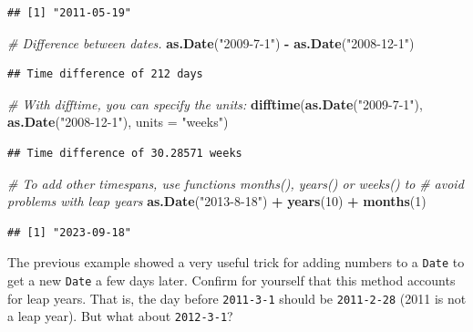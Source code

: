 \documentclass[]{book}
\newenvironment{Shaded}{\begin{snugshade}}{\end{snugshade}}
\newcommand{\CommentTok}[1]{\textcolor[rgb]{0.56,0.35,0.01}{\textit{#1}}}
\newcommand{\DataTypeTok}[1]{\textcolor[rgb]{0.13,0.29,0.53}{#1}}
\newcommand{\DecValTok}[1]{\textcolor[rgb]{0.00,0.00,0.81}{#1}}
\newcommand{\KeywordTok}[1]{\textcolor[rgb]{0.13,0.29,0.53}{\textbf{#1}}}
\newcommand{\NormalTok}[1]{#1}
\newcommand{\OperatorTok}[1]{\textcolor[rgb]{0.81,0.36,0.00}{\textbf{#1}}}
\newcommand{\StringTok}[1]{\textcolor[rgb]{0.31,0.60,0.02}{#1}}
\let\BeginKnitrBlock\begin \let\EndKnitrBlock\end
\begin{document}
\begin{verbatim}
## [1] "2011-05-19"
\end{verbatim}

\begin{Shaded}
\begin{Highlighting}[]
\CommentTok{# Difference between dates.}
\KeywordTok{as.Date}\NormalTok{(}\StringTok{"2009-7-1"}\NormalTok{) }\OperatorTok{-}\StringTok{ }\KeywordTok{as.Date}\NormalTok{(}\StringTok{"2008-12-1"}\NormalTok{)}
\end{Highlighting}
\end{Shaded}

\begin{verbatim}
## Time difference of 212 days
\end{verbatim}

\begin{Shaded}
\begin{Highlighting}[]
\CommentTok{# With difftime, you can specify the units:}
\KeywordTok{difftime}\NormalTok{(}\KeywordTok{as.Date}\NormalTok{(}\StringTok{"2009-7-1"}\NormalTok{), }\KeywordTok{as.Date}\NormalTok{(}\StringTok{"2008-12-1"}\NormalTok{), }\DataTypeTok{units =} \StringTok{"weeks"}\NormalTok{)}
\end{Highlighting}
\end{Shaded}

\begin{verbatim}
## Time difference of 30.28571 weeks
\end{verbatim}

\begin{Shaded}
\begin{Highlighting}[]
\CommentTok{# To add other timespans, use functions months(), years() or weeks() to}
\CommentTok{# avoid problems with leap years}
\KeywordTok{as.Date}\NormalTok{(}\StringTok{"2013-8-18"}\NormalTok{) }\OperatorTok{+}\StringTok{ }\KeywordTok{years}\NormalTok{(}\DecValTok{10}\NormalTok{) }\OperatorTok{+}\StringTok{ }\KeywordTok{months}\NormalTok{(}\DecValTok{1}\NormalTok{)}
\end{Highlighting}
\end{Shaded}

\begin{verbatim}
## [1] "2023-09-18"
\end{verbatim}

\BeginKnitrBlock{rmdtry}
The previous example showed a very useful trick for adding numbers to a \texttt{Date} to get a new \texttt{Date} a few days later. Confirm for yourself that this method accounts for leap years. That is, the day before \texttt{2011-3-1} should be \texttt{2011-2-28} (2011 is not a leap year). But what about \texttt{2012-3-1}?
\EndKnitrBlock{rmdtry}
\end{document}
